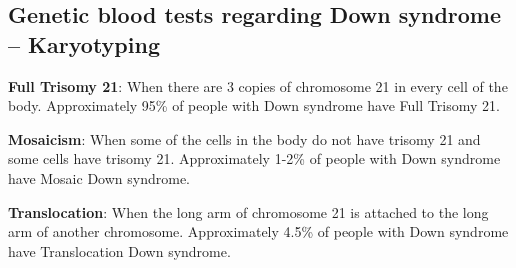 \subsection{Genetic blood tests regarding Down syndrome – Karyotyping}

\textbf{Full Trisomy 21}: When there are 3 copies of chromosome 21 in every cell of the body.  Approximately 95\% of people with Down syndrome have Full Trisomy 21.

\textbf{Mosaicism}: When some of the cells in the body do not have trisomy 21 and some cells have trisomy 21. Approximately 1-2\% of people with Down syndrome have Mosaic Down syndrome.
 
\textbf{Translocation}: When the long arm of chromosome 21 is attached to the long arm of another chromosome. Approximately 4.5\% of people with Down syndrome have Translocation Down syndrome. \\
